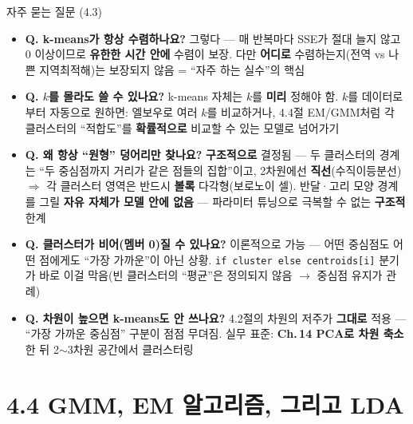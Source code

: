 \documentclass[aspectratio=169,11pt]{beamer}
\begin{document}
\begin{frame}{자주 묻는 질문 (4.3)}
  \small
  \begin{itemize}
    \item \textbf{Q. k-means가 항상 수렴하나요?}
      그렇다 --- 매 반복마다 SSE가 절대 늘지 않고 $0$ 이상이므로
      \textbf{유한한 시간 안에} 수렴이 보장. 다만
      \textbf{어디로} 수렴하는지(전역 vs 나쁜 지역최적해)는
      보장되지 않음 = ``자주 하는 실수''의 핵심
    \item \textbf{Q. $k$를 몰라도 쓸 수 있나요?}
      k-means 자체는 $k$를 \textbf{미리} 정해야 함.
      $k$를 데이터로부터 자동으로 원하면: 엘보우로 여러 $k$를
      비교하거나, 4.4절 EM/GMM처럼 각 클러스터의 ``적합도''를
      \textbf{확률적으로} 비교할 수 있는 모델로 넘어가기
    \item \textbf{Q. 왜 항상 ``원형'' 덩어리만 찾나요?}
      \textbf{구조적으로} 결정됨 --- 두 클러스터의 경계는
      ``두 중심점까지 거리가 같은 점들의 집합''이고, 2차원에선
      \textbf{직선}(수직이등분선) $\Rightarrow$ 각 클러스터 영역은
      반드시 \textbf{볼록} 다각형(보로노이 셀). 반달·고리 모양
      경계를 그릴 \textbf{자유 자체가 모델 안에 없음} ---
      파라미터 튜닝으로 극복할 수 없는 \textbf{구조적} 한계
    \item \textbf{Q. 클러스터가 비어(멤버 0)질 수 있나요?}
      이론적으로 가능 --- 어떤 중심점도 어떤 점에게도 ``가장
      가까운''이 아닌 상황. \texttt{if cluster else
      centroids[i]} 분기가 바로 이걸 막음(빈 클러스터의
      ``평균''은 정의되지 않음 $\to$ 중심점 유지가 관례)
    \item \textbf{Q. 차원이 높으면 k-means도 안 쓰나요?}
      4.2절의 차원의 저주가 \textbf{그대로} 적용 --- ``가장
      가까운 중심점'' 구분이 점점 무뎌짐. 실무 표준:
      \textbf{Ch.\,14 PCA로 차원 축소}한 뒤 2$\sim$3차원 공간에서
      클러스터링
  \end{itemize}
\end{frame}

\section{4.4 GMM, EM 알고리즘, 그리고 LDA}
\end{document}
